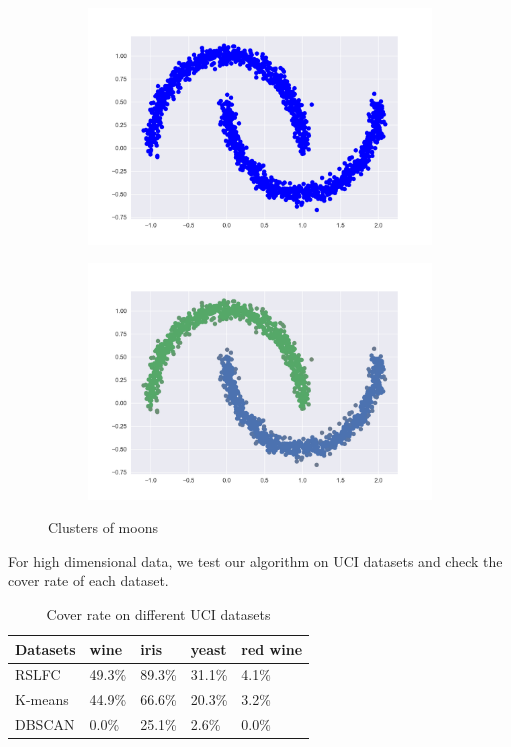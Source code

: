 \documentclass{article}
\begin{document}
	\begin{figure}[h!]
		\begin{subfigure}{.5\textwidth}
			\centering
			\includegraphics[width=\linewidth]{m_figure_1.png}
			\caption{}
		\end{subfigure}%
		\begin{subfigure}{.5\textwidth}
			\centering
			\includegraphics[width=\linewidth]{m_figure_2.png}
			\caption{}
		\end{subfigure}
		\caption{Clusters of moons}
	\end{figure}
	
	\newpage
	
	For high dimensional data, we test our algorithm on UCI datasets and check the cover rate of each dataset.
	
	\begin{table}[t]
		\caption{Cover rate on different UCI datasets}
		\label{sample-table}
		\centering
		\begin{tabular}{l  l  l  l  l }
			\toprule
			Datasets & wine & iris & yeast & red wine\\ \hline
			RSLFC & 49.3\% & 89.3\% & 31.1\% & 4.1\% \\ \hline
			K-means & 44.9\% & 66.6\% & 20.3\% & 3.2\%  \\ \hline
			DBSCAN & 0.0\% & 25.1\% & 2.6\% & 0.0\%  \\ \hline
		\end{tabular}
	\end{table}
	
\end{document}
